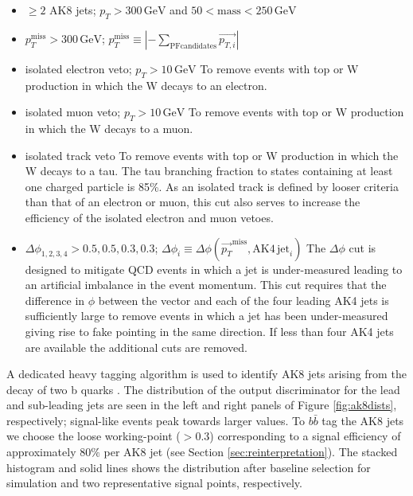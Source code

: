 \begin{itemize}
\item $\geq2$ AK8 jets; $p_{T} > 300\,\mathrm{GeV}$ and $50 < \mathrm{mass} < 250\,\mathrm{GeV}$
\item $p_{T}^{\mathrm{miss}} > 300\,\mathrm{GeV}$; $p_{T}^{\mathrm{miss}} \equiv |-\sum_{\mathrm{PFcandidates}}\vec{p_{T, i}}|$
\item isolated electron veto; $p_{T}>10\,\mathrm{GeV}$\newline
To remove events with top or W production in which the W decays to an electron.
\item isolated muon veto; $p_{T}>10\,\mathrm{GeV}$\newline
To remove events with top or W production in which the W decays to a muon.
\item isolated track veto\newline
To remove events with top or W production in which the W decays to a tau. The tau branching fraction to states containing at least one charged particle is 85\%. As an isolated track is defined by looser criteria than that of an electron or muon, this cut also serves to increase the efficiency of the isolated electron and muon vetoes.

\item $\Delta\phi_{1, 2, 3, 4} > 0.5, 0.5, 0.3, 0.3$; $\Delta\phi_{i}\equiv \Delta\phi(\vec{p_{T}}^{\mathrm{miss}}, \mathrm{AK4\,jet}_{i})$\newline
The $\Delta\phi$ cut is designed to mitigate QCD events in which a jet is under-measured leading to an artificial imbalance in the event momentum. This cut requires that the difference in $\phi$ between the \ptmiss vector and each of the four leading AK4 jets is sufficiently large to remove events in which a jet has been under-measured giving rise to fake \ptmiss pointing in the same direction. If less than four AK4 jets are available the additional cuts are removed.
\end{itemize}

A dedicated heavy tagging algorithm is used to identify AK8 jets arising from the decay of two b quarks \cite{bbtagger}. The distribution of the output discriminator for the lead and sub-leading jets are seen in the left and right panels of Figure \ref{fig:ak8dists}, respectively; signal-like events peak towards larger values. To $b\bar{b}$ tag the AK8 jets we choose the loose working-point ($>$0.3) corresponding to a signal efficiency of approximately $80\%$ per AK8 jet (see Section \ref{sec:reinterpretation}). The stacked histogram and solid lines shows the distribution after baseline selection for simulation and two representative signal points, respectively.

